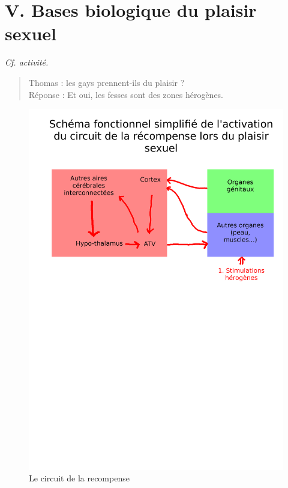 \documentclass[12pt]{article}
\begin{document}
\section*{V. Bases biologique du plaisir sexuel}

\textit{Cf. activité.}

\begin{quotation}
Thomas : les gays prennent-ils du plaisir ?\\
Réponse : Et oui, les fesses sont des zones hérogènes.
\end{quotation}

\begin{figure}[htp]
\centering
\includegraphics[scale=0.7]{img/circuit-de-la-recompense.png}
\caption{Le circuit de la recompense}
\label{}
\end{figure}
\end{document}
